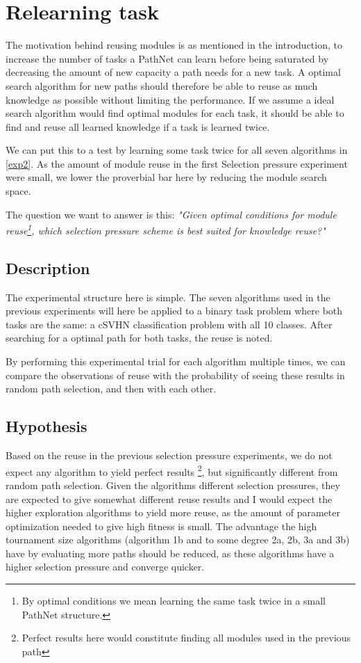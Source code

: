 \chapter{Relearning task}
The motivation behind reusing modules is as mentioned in the introduction, to increase the number of tasks a PathNet can learn before being saturated by decreasing the amount of new capacity a path needs for a new task. A optimal search algorithm for new paths should therefore be able to reuse as much knowledge as possible without limiting the performance. If we assume a ideal search algorithm would find optimal modules for each task, it should be able to find and reuse all learned knowledge if a task is learned twice. 

We can put this to a test by learning some task twice for all seven algorithms in \ref{exp2}. As the amount of module reuse in the first Selection pressure experiment were small, we lower the proverbial bar here by reducing the module search space.

The question we want to answer is this: \textit{"Given optimal conditions for module reuse\footnote{By optimal conditions we mean learning the same task twice in a small PathNet structure.}, which selection pressure scheme is best suited for knowledge reuse?"}

\section{Description}
The experimental structure here is simple. The seven algorithms used in the previous experiments will here be applied to a binary task problem where both tasks are the same: a cSVHN classification problem with all 10 classes. After searching for a optimal path for both tasks, the reuse is noted. 

By performing this experimental trial for each algorithm multiple times, we can compare the observations of reuse with the probability of seeing these results in random path selection, and then with each other. 

\section{Hypothesis}
Based on the reuse in the previous selection pressure experiments, we do not expect any algorithm to yield perfect results \footnote{Perfect results here would constitute finding all modules used in the previous path}, but significantly different from random path selection. Given the algorithms different selection pressures, they are expected to give somewhat different reuse results and I would expect the higher exploration algorithms to yield more reuse, as the amount of parameter optimization needed to give high fitness is small. The advantage the high tournament size algorithms (algorithm 1b and to some degree 2a, 2b, 3a and 3b) have by evaluating more paths should be reduced, as these algorithms have a higher selection pressure and converge quicker. 

